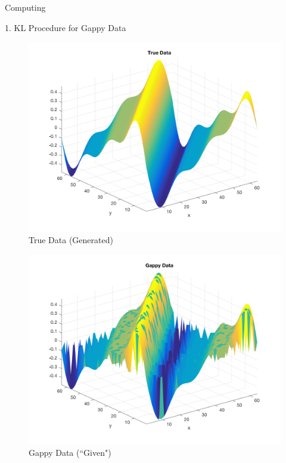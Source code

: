 \begin{section}{Computing}
\begin{homeworkSection}{1. KL Procedure for Gappy Data}
{    \begin{minipage}{0.5\textwidth}
        \begin{figure}[H]
        \centering
        \includegraphics[trim={0cm 0cm 0cm 0cm},clip,width=1.0\columnwidth]{../data/true_data}
        \caption{True Data (Generated)}
        \label{fig:true_data}
        \end{figure}
    \end{minipage}
    \begin{minipage}{0.5\textwidth}
        \begin{figure}[H]
        \centering
        \includegraphics[trim={0cm 0cm 0cm 0cm},clip,width=1.0\columnwidth]{../data/gappy_data}
        \caption{Gappy Data (``Given")}

\end{figure}
\end{minipage}}
\end{homeworkSection}
\end{section}
